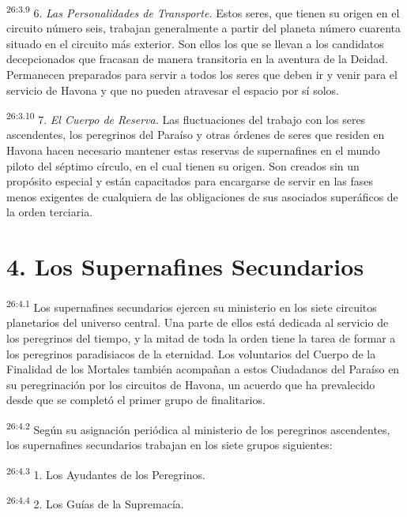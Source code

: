 \par
\textsuperscript{26:3.9} 6. \textit{Las Personalidades de Transporte.} Estos seres, que tienen su origen en el circuito número seis, trabajan generalmente a partir del planeta número cuarenta situado en el circuito más exterior. Son ellos los que se llevan a los candidatos decepcionados que fracasan de manera transitoria en la aventura de la Deidad. Permanecen preparados para servir a todos los seres que deben ir y venir para el servicio de Havona y que no pueden atravesar el espacio por sí solos.

\par
\textsuperscript{26:3.10} 7. \textit{El Cuerpo de Reserva.} Las fluctuaciones del trabajo con los seres ascendentes, los peregrinos del Paraíso y otras órdenes de seres que residen en Havona hacen necesario mantener estas reservas de supernafines en el mundo piloto del séptimo círculo, en el cual tienen su origen. Son creados sin un propósito especial y están capacitados para encargarse de servir en las fases menos exigentes de cualquiera de las obligaciones de sus asociados superáficos de la orden terciaria.

\section*{4. Los Supernafines Secundarios}
\par
\textsuperscript{26:4.1} Los supernafines secundarios ejercen su ministerio en los siete circuitos planetarios del universo central. Una parte de ellos está dedicada al servicio de los peregrinos del tiempo, y la mitad de toda la orden tiene la tarea de formar a los peregrinos paradisiacos de la eternidad. Los voluntarios del Cuerpo de la Finalidad de los Mortales también acompañan a estos Ciudadanos del Paraíso en su peregrinación por los circuitos de Havona, un acuerdo que ha prevalecido desde que se completó el primer grupo de finalitarios.

\par
\textsuperscript{26:4.2} Según su asignación periódica al ministerio de los peregrinos ascendentes, los supernafines secundarios trabajan en los siete grupos siguientes:

\par
\textsuperscript{26:4.3} 1. Los Ayudantes de los Peregrinos.

\par
\textsuperscript{26:4.4} 2. Los Guías de la Supremacía.

